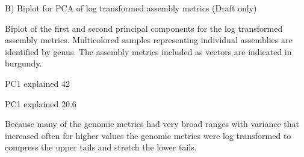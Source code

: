 B) Biplot for PCA of log transformed assembly metrics (Draft only)

Biplot of the first and second principal components for the log transformed assembly metrics. Multicolored samples representing individual assemblies are identified by genus. The assembly metrics included as vectors are indicated in burgundy.

PC1 explained 42%

PC1 explained 20.6%

Because many of the genomic metrics had very broad ranges with variance that increased often for higher values the genomic metrics were log transformed to compress the upper tails and stretch the lower tails.
